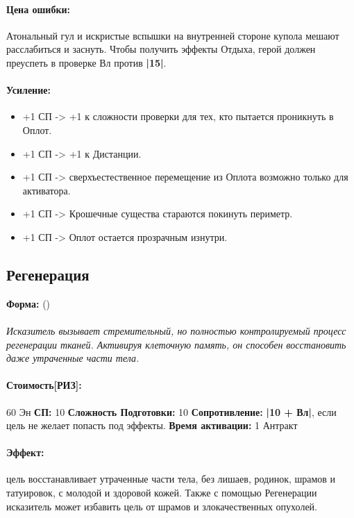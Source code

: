 \paragraph{Цена ошибки: }Атональный гул и искристые вспышки на внутренней стороне купола мешают расслабиться и заснуть. Чтобы получить эффекты Отдыха, герой должен преуспеть в проверке Вл против 
\textbf{|15|}.
\paragraph{Усиление:}
\begin{itemize}
\item+1 СП -> +1 к сложности проверки для тех, кто пытается проникнуть в Оплот.
\item+1 СП -> +1 к Дистанции.
\item+1 СП -> сверхъестественное перемещение из Оплота возможно только для активатора.
\item+1 СП -> Крошечные существа стараются покинуть периметр.
\item+1 СП -> Оплот остается прозрачным изнутри.
\end{itemize}
\subsection{Регенерация}
\textbf{Форма: }()
\paragraph{} 
\textit{Исказитель вызывает стремительный, но полностью контролируемый процесс регенерации тканей. Активируя клеточную память, он способен восстановить даже утраченные части тела.}
\paragraph{Стоимость[РИЗ]: }60 Эн
\leavevmode
\newline 
\textbf{СП: }10
\leavevmode
\newline 
\textbf{Сложность Подготовки: }10
\leavevmode
\newline 
\textbf{Сопротивление: }
\textbf{|10 + Вл|}, если цель не желает попасть под эффекты.
\leavevmode
\newline 
\textbf{Время активации: }1 Антракт
\paragraph{Эффект: }цель восстанавливает утраченные части тела, без лишаев, родинок, шрамов и татуировок, с молодой и здоровой кожей. 
\newline Также с помощью Регенерации исказитель может избавить цель от шрамов и злокачественных опухолей.
